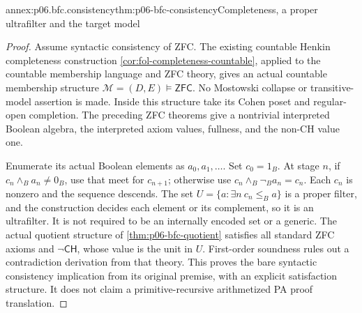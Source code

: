 \begin{annexitem}{annex:p06.bfc.consistency}{thm:p06-bfc-consistency}{Completeness, a proper ultrafilter and the target model}
\begin{proof}
Assume syntactic consistency of ZFC. The existing countable Henkin
completeness construction \cref{cor:fol-completeness-countable}, applied
to the countable membership language and ZFC theory, gives an actual
countable membership structure \(\mathcal M=(D,E)\models\mathsf{ZFC}\).
No Mostowski collapse or transitive-model assertion is made.
Inside this structure take its Cohen poset and regular-open completion.
The preceding ZFC theorems give a nontrivial interpreted Boolean algebra,
the interpreted axiom values, fullness, and the non-CH value one.

Enumerate its actual Boolean elements as \(a_0,a_1,\ldots\). Set
\(c_0=1_B\). At stage \(n\), if \(c_n\wedge_B a_n\ne0_B\), use
that meet for \(c_{n+1}\); otherwise use
\(c_n\wedge_B\neg_B a_n=c_n\). Each \(c_n\) is nonzero and the
sequence descends. The set
\(U=\{a:\exists n\ c_n\leq_B a\}\) is a proper filter, and the
construction decides each element or its complement, so it is an
ultrafilter. It is not required to be an internally encoded set or a generic.
The actual quotient structure of \cref{thm:p06-bfc-quotient} satisfies
all standard ZFC axioms and \(\neg\mathsf{CH}\), whose value is the unit
in \(U\). First-order soundness rules out a contradiction derivation
from that theory. This proves the bare syntactic consistency implication
from its original premise, with an explicit satisfaction structure.
It does not claim a primitive-recursive arithmetized PA proof translation.
\end{proof}
\end{annexitem}
